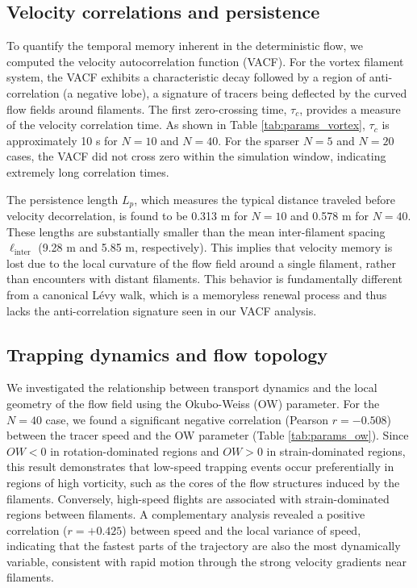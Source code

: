 \documentclass[]{article}
\begin{document}
\subsection{Velocity correlations and persistence}

To quantify the temporal memory inherent in the deterministic flow, we computed the velocity autocorrelation function (VACF). For the vortex filament system, the VACF exhibits a characteristic decay followed by a region of anti-correlation (a negative lobe), a signature of tracers being deflected by the curved flow fields around filaments. The first zero-crossing time, $\tau_c$, provides a measure of the velocity correlation time. As shown in Table \ref{tab:params_vortex}, $\tau_c$ is approximately 10 s for $N=10$ and $N=40$. For the sparser $N=5$ and $N=20$ cases, the VACF did not cross zero within the simulation window, indicating extremely long correlation times.

The persistence length $L_p$, which measures the typical distance traveled before velocity decorrelation, is found to be 0.313 m for $N=10$ and 0.578 m for $N=40$. These lengths are substantially smaller than the mean inter-filament spacing $\ell_{\text{inter}}$ (9.28 m and 5.85 m, respectively). This implies that velocity memory is lost due to the local curvature of the flow field around a single filament, rather than encounters with distant filaments. This behavior is fundamentally different from a canonical L\'evy walk, which is a memoryless renewal process and thus lacks the anti-correlation signature seen in our VACF analysis.

\subsection{Trapping dynamics and flow topology}

We investigated the relationship between transport dynamics and the local geometry of the flow field using the Okubo-Weiss (OW) parameter. For the $N=40$ case, we found a significant negative correlation (Pearson $r = -0.508$) between the tracer speed and the OW parameter (Table \ref{tab:params_ow}). Since $OW < 0$ in rotation-dominated regions and $OW > 0$ in strain-dominated regions, this result demonstrates that low-speed trapping events occur preferentially in regions of high vorticity, such as the cores of the flow structures induced by the filaments. Conversely, high-speed flights are associated with strain-dominated regions between filaments. A complementary analysis revealed a positive correlation ($r = +0.425$) between speed and the local variance of speed, indicating that the fastest parts of the trajectory are also the most dynamically variable, consistent with rapid motion through the strong velocity gradients near filaments.
\end{document}

